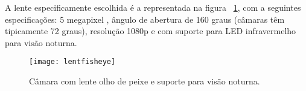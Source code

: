 A lente especificamente escolhida é a representada na figura ~\ref{fig:lentfisheye}, com a seguintes especificações: 5 megapixel , ângulo de abertura de 160 graus (câmaras têm tipicamente 72 graus), resolução 1080p e com suporte para LED infravermelho para visão noturna.

\begin{figure}[h!]%
	\begin{center}
		\leavevmode		
		\texttt{[image: lentfisheye]}
		\caption{Câmara com lente olho de peixe e suporte para visão noturna.}
		\label{fig:lentfisheye}
	\end{center}
\end{figure}
